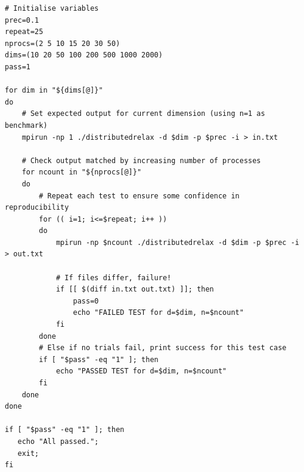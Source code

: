 \documentclass[11pt]{article}
\begin{document}
\begin{appendices}
\begin{verbatim}
# Initialise variables
prec=0.1
repeat=25
nprocs=(2 5 10 15 20 30 50)
dims=(10 20 50 100 200 500 1000 2000)
pass=1

for dim in "${dims[@]}"
do
    # Set expected output for current dimension (using n=1 as benchmark)
    mpirun -np 1 ./distributedrelax -d $dim -p $prec -i > in.txt

    # Check output matched by increasing number of processes
    for ncount in "${nprocs[@]}"
    do
        # Repeat each test to ensure some confidence in reproducibility
        for (( i=1; i<=$repeat; i++ )) 
        do  
            mpirun -np $ncount ./distributedrelax -d $dim -p $prec -i > out.txt

            # If files differ, failure!
            if [[ $(diff in.txt out.txt) ]]; then 
                pass=0
                echo "FAILED TEST for d=$dim, n=$ncount"
            fi
        done
        # Else if no trials fail, print success for this test case
        if [ "$pass" -eq "1" ]; then
            echo "PASSED TEST for d=$dim, n=$ncount"
        fi
    done
done

if [ "$pass" -eq "1" ]; then
   echo "All passed.";
   exit;
fi
\end{verbatim}

\end{appendices}
\end{document}
